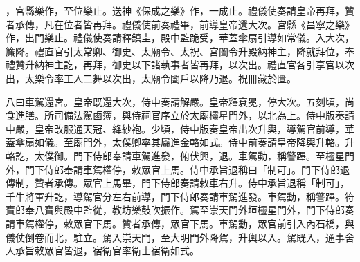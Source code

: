 \begin{pinyinscope}
，宮縣樂作，至位樂止。送神《保成之樂》作，一成止。禮儀使奏請皇帝再拜，贊者承傳，凡在位者皆再拜。禮儀使前奏禮畢，前導皇帝還大次。宮縣《昌寧之樂》作，出門樂止。禮儀使奏請釋鎮圭，殿中監跪受，華蓋傘扇引導如常儀。入大次，簾降。禮直官引太常卿、御史、太廟令、太祝、宮闈令升殿納神主，降就拜位，奉禮贊升納神主訖，再拜，御史以下諸執事者皆再拜，以次出。禮直官各引享官以次出，太樂令率工人二舞以次出，太廟令闔戶以降乃退。祝冊藏於匱。



 八曰車駕還宮。皇帝既還大次，侍中奏請解嚴。皇帝釋袞冕，停大次。五刻頃，尚食進膳。所司備法駕鹵簿，與侍祠官序立於太廟欞星門外，以北為上。侍中版奏請中嚴，皇帝改服通天冠、絳紗袍。少頃，侍中版奏皇帝出次升輿，導駕官前導，華蓋傘扇如儀。至廟門外，太僕卿率其屬進金輅如式。侍中前奏請皇帝降輿升輅。升輅訖，太僕御。門下侍郎奉請車駕進發，俯伏興，退。車駕動，稱警蹕。至欞星門外，門下侍郎奉請車駕權停，敕眾官上馬。侍中承旨退稱曰「制可」。門下侍郎退傳制，贊者承傳。眾官上馬畢，門下侍郎奏請敕車右升。侍中承旨退稱「制可」，千牛將軍升訖，導駕官分左右前導，門下侍郎奏請車駕進發。車駕動，稱警蹕。符寶郎奉八寶與殿中監從，教坊樂鼓吹振作。駕至崇天門外垣欞星門外，門下侍郎奏請車駕權停，敕眾官下馬。贊者承傳，眾官下馬。車駕動，眾官前引入內石橋，與儀仗倒卷而北，駐立。駕入崇天門，至大明門外降駕，升輿以入。駕既入，通事舍人承旨敕眾官皆退，宿衛官率衛士宿衛如式。



\end{pinyinscope}